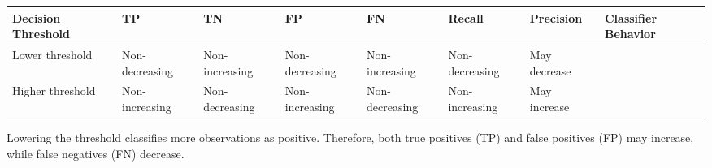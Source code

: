 \documentclass[
  letterpaper,
  DIV=11,
  numbers=noendperiod]{scrreprt}
\newcounter{none} %
\theoremstyle{definition}
\theoremstyle{definition}
\theoremstyle{plain}
\theoremstyle{plain}
\theoremstyle{remark}
\begin{document}
{\def\LTcaptype{none} %
\begin{longtable}[]{@{}
  >{\raggedright\arraybackslash}p{}
  >{\raggedright\arraybackslash}p{}
  >{\raggedright\arraybackslash}p{}
  >{\raggedright\arraybackslash}p{}
  >{\raggedright\arraybackslash}p{}
  >{\raggedright\arraybackslash}p{}
  >{\raggedright\arraybackslash}p{}
  >{\raggedright\arraybackslash}p{}@{}}
\toprule\noalign{}
\begin{minipage}[b]{\linewidth}\raggedright
Decision Threshold
\end{minipage} & \begin{minipage}[b]{\linewidth}\raggedright
TP
\end{minipage} & \begin{minipage}[b]{\linewidth}\raggedright
TN
\end{minipage} & \begin{minipage}[b]{\linewidth}\raggedright
FP
\end{minipage} & \begin{minipage}[b]{\linewidth}\raggedright
FN
\end{minipage} & \begin{minipage}[b]{\linewidth}\raggedright
Recall
\end{minipage} & \begin{minipage}[b]{\linewidth}\raggedright
Precision
\end{minipage} & \begin{minipage}[b]{\linewidth}\raggedright
Classifier Behavior
\end{minipage} \\
\midrule\noalign{}
\endhead
\bottomrule\noalign{}
\endlastfoot
Lower threshold & Non-decreasing & Non-increasing & Non-decreasing &
Non-increasing & Non-decreasing & May decrease & \\
Higher threshold & Non-increasing & Non-decreasing & Non-increasing &
Non-decreasing & Non-increasing & May increase & \\
\end{longtable}
}

Lowering the threshold classifies more observations as positive.
Therefore, both true positives (TP) and false positives (FP) may
increase, while false negatives (FN) decrease.
\end{document}
